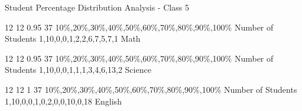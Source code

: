 \label{1.3.2 C5 Student Distribution Analysis}
    \renewcommand{\insertclass}{ - Class 5}

    \renewcommand{\insertsubject}{Math \& Science \& English}


    \begin{frame}{Student Percentage Distribution Analysis - Class 5}
    \begin{minipage}{0.285\paperwidth}
    \studentDistribution
        {12}
        {12}
        {0.95}
        {37}
        {10\%,20\%,30\%,40\%,50\%,60\%,70\%,80\%,90\%,100\%}
        {Number of Students}
        {}
        {{1},{10},{0,0,1,2,2,6,7,5,7,1}}
        {Math}
    \end{minipage}
    \begin{minipage}{0.285\paperwidth}
    \studentDistribution
        {12}
        {12}
        {0.95}
        {37}
        {10\%,20\%,30\%,40\%,50\%,60\%,70\%,80\%,90\%,100\%}
        {Number of Students}
        {}
        {{1},{10},{0,0,1,1,1,3,4,6,13,2}}
        {Science}
    \end{minipage}
    \begin{minipage}{0.285\paperwidth}
    \studentDistributionwithoutline
        {12}
        {12}
        {1}
        {37}
        {10\%,20\%,30\%,40\%,50\%,60\%,70\%,80\%,90\%,100\%}
        {Number of Students}
        {}
        {{1},{10},{0,0,1,0,2,0,0,10,0,18}}
        {English}
    \end{minipage}
    
    \end{frame}

    
    